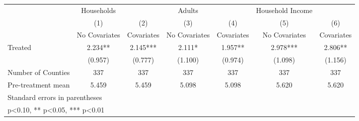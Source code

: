{
\def\sym#1{\ifmmode^{#1}\else\(^{#1}\)\fi}
\begin{tabular}{l*{6}{c}}
\hline\hline
            &  Households   &               &      Adults   &               &Household Income   &               \\
            &\multicolumn{1}{c}{(1)}&\multicolumn{1}{c}{(2)}&\multicolumn{1}{c}{(3)}&\multicolumn{1}{c}{(4)}&\multicolumn{1}{c}{(5)}&\multicolumn{1}{c}{(6)}\\
            &\multicolumn{1}{c}{No Covariates}&\multicolumn{1}{c}{Covariates}&\multicolumn{1}{c}{No Covariates}&\multicolumn{1}{c}{Covariates}&\multicolumn{1}{c}{No Covariates}&\multicolumn{1}{c}{Covariates}\\
\hline
Treated     &       2.234** &       2.145***&       2.111*  &       1.957** &       2.978***&       2.806** \\
            &     (0.957)   &     (0.777)   &     (1.100)   &     (0.974)   &     (1.098)   &     (1.156)   \\
\hline
Number of Counties&         337   &         337   &         337   &         337   &         337   &         337   \\
Pre-treatment mean&       5.459   &       5.459   &       5.098   &       5.098   &       5.620   &       5.620   \\
\hline\hline
\multicolumn{7}{l}{\footnotesize Standard errors in parentheses}\\
\multicolumn{7}{l}{\footnotesize * p<0.10, ** p<0.05, *** p<0.01}\\
\end{tabular}
}
